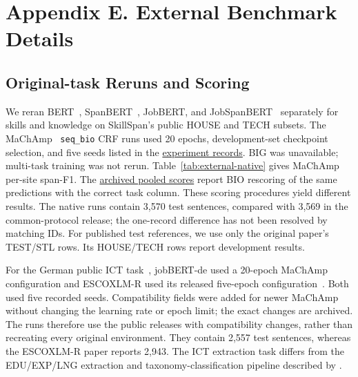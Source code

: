 \FloatBarrier
\section{Appendix E. External Benchmark Details}
\label{app:e}
\subsection{Original-task Reruns and Scoring}
We reran BERT~\citep{devlin2019bert}, SpanBERT~\citep{joshi2020spanbert}, JobBERT, and JobSpanBERT~\citep{zhang2022skillspan} separately for skills and knowledge on SkillSpan's public HOUSE and TECH subsets. The MaChAmp~\citep{vandergoot2021machamp} \texttt{seq\_bio} CRF runs used 20 epochs, development-set checkpoint selection, and five seeds listed in the \href{https://github.com/AlfredJamesLi/chinese-skillspan-benchmark/blob/36f009fab01b8433355cb7ef5af8fad02c6cc519/reproduction/process_archive_20260924/source/tex/external_benchmarks/paper_appendix.tex}{experiment records}. BIG was unavailable; multi-task training was not rerun. Table~\ref{tab:external-native} gives MaChAmp per-site span-F1. The \href{https://github.com/AlfredJamesLi/chinese-skillspan-benchmark/blob/36f009fab01b8433355cb7ef5af8fad02c6cc519/reproduction/process_archive_20260924/README.md#skillspan-pooled-scores-previous-table-25}{archived pooled scores} report BIO rescoring of the same predictions with the correct task column. These scoring procedures yield different results. The native runs contain 3,570 test sentences, compared with 3,569 in the common-protocol release; the one-record difference has not been resolved by matching IDs. For published test references, we use only the original paper's TEST/STL rows. Its HOUSE/TECH rows report development results.

For the German public ICT task~\citep{gnehm2022transfer}, jobBERT-de used a 20-epoch MaChAmp configuration and ESCOXLM-R used its released five-epoch configuration~\citep{zhang2023escoxlmr}. Both used five recorded seeds. Compatibility fields were added for newer MaChAmp without changing the learning rate or epoch limit; the exact changes are archived. The runs therefore use the public releases with compatibility changes, rather than recreating every original environment. They contain 2,557 test sentences, whereas the ESCOXLM-R paper reports 2,943. The ICT extraction task differs from the EDU/EXP/LNG extraction and taxonomy-classification pipeline described by \citet{gnehm2022skills}.

